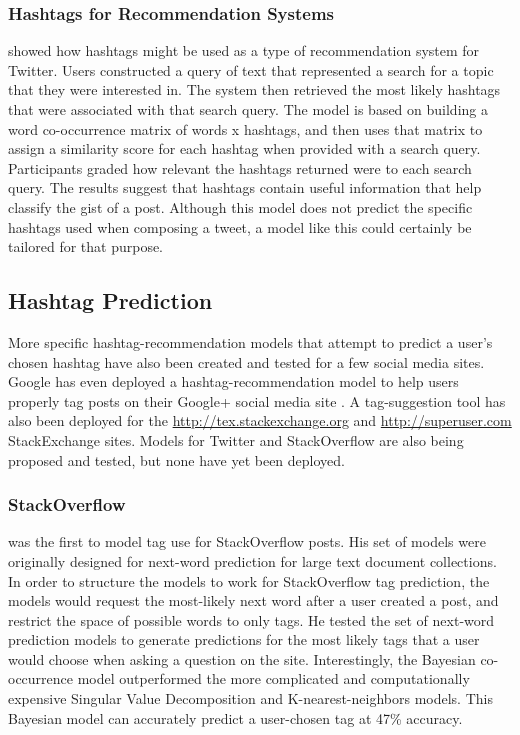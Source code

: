 \documentclass[man,floatsintext,donotrepeattitle]{apa6}
\begin{document}
\subsubsection{Hashtags for Recommendation Systems}

\textcite{Efron2010} showed how hashtags might be used as a type of recommendation system for Twitter.
Users constructed a query of text that represented a search for a topic that they were interested in.
The system then retrieved the most likely hashtags that were associated with that search query.
The model is based on building a word co-occurrence matrix of words x hashtags, and then uses that matrix to assign a similarity score for each hashtag when provided with a search query.
Participants graded how relevant the hashtags returned were to each search query.
The results suggest that hashtags contain useful information that help classify the gist of a post. 
Although this model does not predict the specific hashtags used when composing a tweet, a model like this could certainly be tailored for that purpose.

\subsection{Hashtag Prediction}

More specific hashtag-recommendation models that attempt to predict a user's chosen hashtag have also been created and tested for a few social media sites.
Google has even deployed a hashtag-recommendation model to help users properly tag posts on their Google+ social media site \parencite{GoogleKeynote2013}.
A tag-suggestion tool has also been deployed for the \url{http://tex.stackexchange.org} and \url{http://superuser.com} StackExchange sites.
Models for Twitter and StackOverflow are also being proposed and tested, but none have yet been deployed.

\subsubsection{StackOverflow}

\textcite{Kuo2011} was the first to model tag use for StackOverflow posts.
His set of models were originally designed for next-word prediction for large text document collections.
In order to structure the models to work for StackOverflow tag prediction, the models would request the most-likely next word after a user created a post, and restrict the space of possible words to only tags.
He tested the set of next-word prediction models to generate predictions for the most likely tags that a user would choose when asking a question on the site.
Interestingly, the Bayesian co-occurrence model outperformed the more complicated and computationally expensive Singular Value Decomposition and K-nearest-neighbors models.
This Bayesian model can accurately predict a user-chosen tag at 47\% accuracy.
\end{document}
